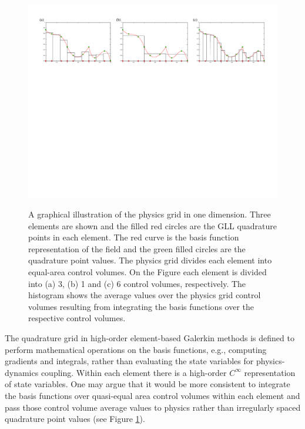 \documentclass[twocol]{ametsoc}
\begin{document}
\begin{figure}[t]
\noindent\includegraphics[width=38pc,angle=0]{figs/physgrid-1d.pdf}\\
\caption{A graphical illustration of the physics grid in one dimension. Three elements are shown and the filled red circles are the GLL quadrature points in each element. The red curve is the basis function representation of the field and the green filled circles are the quadrature point values. The physics grid divides each element into equal-area control volumes. On the Figure each element is divided into (a) 3, (b) 1 and (c) 6 control volumes, respectively. The histogram shows the average values over the physics grid control volumes resulting from integrating the basis functions over the respective control volumes.}
\label{fig:physgrid-1d}
\end{figure}

The quadrature grid in high-order element-based Galerkin methods is defined to perform mathematical operations on the basis functions, e.g., computing gradients and integrals, rather than evaluating the state variables for physics-dynamics coupling. Within each element there is a high-order $C^{\infty}$ representation of state variables. One may argue that it would be more consistent to integrate the basis functions over quasi-equal area control volumes within each element and pass those control volume average values to physics rather than irregularly spaced quadrature point values (see Figure \ref{fig:physgrid-1d}).  
\end{document}
